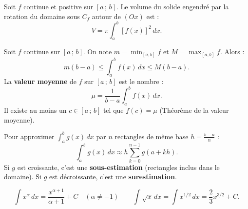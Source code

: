 \documentclass[11pt]{article}
\begin{document}
\begin{propriete}
Soit $f$ continue et positive sur $[a\,;\,b]$. Le volume du solide engendré par la rotation du domaine sous $C_f$ autour de $(Ox)$ est :
\[ V = \pi \int_a^b [f(x)]^2 \, dx. \]
\end{propriete}

\begin{propriete}
Soit $f$ continue sur $[a\,;\,b]$. On note $m = \min_{[a,b]} f$ et $M = \max_{[a,b]} f$. Alors :
\[ m(b-a) \le \int_a^b f(x) \, dx \le M(b-a). \]
La \textbf{valeur moyenne} de $f$ sur $[a\,;\,b]$ est le nombre :
\[ \mu = \frac{1}{b-a} \int_a^b f(x) \, dx. \]
Il existe au moins un $c \in [a\,;\,b]$ tel que $f(c) = \mu$ (Théorème de la valeur moyenne).
\end{propriete}

\begin{propriete}
Pour approximer $\int_a^b g(x) \, dx$ par $n$ rectangles de même base $h = \frac{b-a}{n}$ :
\[ \int_a^b g(x) \, dx \approx h \sum_{k=0}^{n-1} g(a + kh). \]
Si $g$ est croissante, c'est une \textbf{sous-estimation} (rectangles inclus dans le domaine). Si $g$ est décroissante, c'est une \textbf{surestimation}.
\end{propriete}

\begin{aretenir}
\[ \int x^\alpha \, dx = \frac{x^{\alpha+1}}{\alpha+1} + C \quad (\alpha \neq -1) \qquad \int \sqrt{x} \, dx = \int x^{1/2} \, dx = \frac{2}{3} x^{3/2} + C. \]
\end{aretenir}
\end{document}
